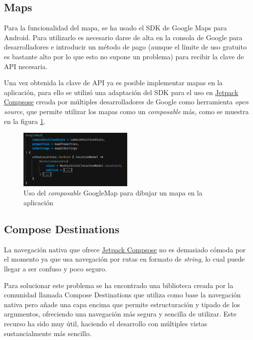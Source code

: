 \subsection{Maps}
Para la funcionalidad del mapa, se ha usado el
SDK de Google Maps para Android\hyperlink{cap:biblio}{}. Para utilizarlo es necesario darse de alta en la consola de Google para desarrolladores e introducir un método de pago (aunque el límite de uso gratuito es bastante alto por lo que esto no supone un problema) para recibir la clave de API necesaria.

Una vez obtenida la clave de API ya es posible implementar mapas en la aplicación, para ello se utilizó una adaptación del SDK para el uso en \hyperlink{subsec:compose}{Jetpack Compsose} creada por múltiples desarrolladores de Google como herramienta \textit{open source}, que permite utilizar los mapas como un \textit{composable} más, como se muestra en la figura \ref{fig:maps_compose}.
\begin{figure}[h]
	\centering
	\includegraphics[width = 0.5\textwidth]{Imagenes/Fuentes/maps_compose.png}
	\caption{Uso del \textit{composable} GoogleMap para dibujar un mapa en la aplicación}
	\label{fig:maps_compose}
\end{figure}

\subsection{Compose Destinations}
La navegación nativa que ofrece \hyperlink{subsec:compose}{Jetpack Compsose} no es demasiado cómoda por el momento ya que usa navegación por rutas en formato de \textit{string}, lo cual puede llegar a ser confuso y poco seguro. 

Para solucionar este problema se ha encontrado una biblioteca creada por la comunidad llamada 
Compose Destinations\hyperlink{cap:biblio}{} que utiliza como base la navegación nativa pero añade una capa encima que permite estructuración y tipado de los argumentos, ofreciendo una navegación más segura y sencilla de utilizar. Este recurso ha sido muy útil, haciendo el desarrollo con múltiples vistas sustancialmente más sencillo.

